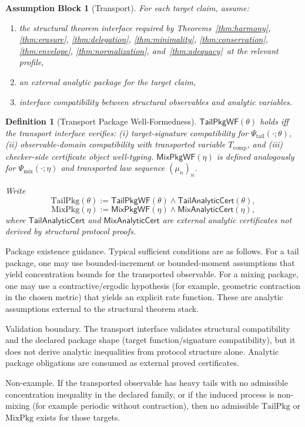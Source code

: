 \documentclass[a4paper,10pt,twocolumn,english]{article}
\numberwithin{equation}{section}
\theoremstyle{paperdef}
\newtheorem{definition}{Definition}[section]
\theoremstyle{paperplain}
\theoremstyle{paperdef}
\theoremstyle{paperremark}
\theoremstyle{paperdef}
\newtheorem{assumptions}[assumption]{Assumption Block}
\newcommand{\ABHStack}{Theorems~\ref{thm:harmony}, \ref{thm:erasure}, \ref{thm:delegation}, \ref{thm:minimality}, \ref{thm:conservation}, \ref{thm:envelope}, \ref{thm:normalization}, and~\ref{thm:adequacy}}
\begin{document}
\begin{assumptions}[Transport]
	\label{assump:p3-transport}
	For each target claim, assume:
	\begin{enumerate}
		\item the structural theorem interface required by \ABHStack\ at the relevant profile,
		\item an external analytic package for the target claim,
		\item interface compatibility between structural observables and analytic variables.
	\end{enumerate}
\end{assumptions}

\begin{definition}[Transport Package Well-Formedness]
	\label{def:p3-transport-pkg-wf}
	$\mathsf{TailPkgWF}(\theta)$ holds iff the transport interface verifies:
	(i) target-signature compatibility for $\Psi_{\mathrm{tail}}(\cdot;\theta)$,
	(ii) observable-domain compatibility with transported variable
	$T_{\mathrm{comp}}$, and (iii) checker-side certificate object well-typing.
	$\mathsf{MixPkgWF}(\eta)$ is defined analogously for
	$\Psi_{\mathrm{mix}}(\cdot;\eta)$ and transported law sequence $(\mu_n)_n$.

	Write
	\[
		\mathrm{TailPkg}(\theta) := \mathsf{TailPkgWF}(\theta)\land \mathsf{TailAnalyticCert}(\theta),
	\]
	\[
		\mathrm{MixPkg}(\eta) := \mathsf{MixPkgWF}(\eta)\land \mathsf{MixAnalyticCert}(\eta),
	\]
	where $\mathsf{TailAnalyticCert}$ and $\mathsf{MixAnalyticCert}$ are external
	analytic certificates not derived by structural protocol proofs.
\end{definition}

Package existence guidance. Typical sufficient conditions are as follows.
For a tail package, one may use bounded-increment or bounded-moment
assumptions that yield concentration bounds for the transported observable.
For a mixing package, one may use a contractive/ergodic hypothesis (for
example, geometric contraction in the chosen metric) that yields an explicit
rate function. These are analytic assumptions external to the structural theorem
stack.

Validation boundary. The transport interface validates structural compatibility
and the declared package shape (target function/signature compatibility), but it
does not derive analytic inequalities from protocol structure alone. Analytic
package obligations are consumed as external proved certificates.

Non-example. If the transported observable has heavy tails with no admissible
concentration inequality in the declared family, or if the induced process is
non-mixing (for example periodic without contraction), then no admissible
$\mathrm{TailPkg}$ or $\mathrm{MixPkg}$ exists for those targets.
\end{document}
